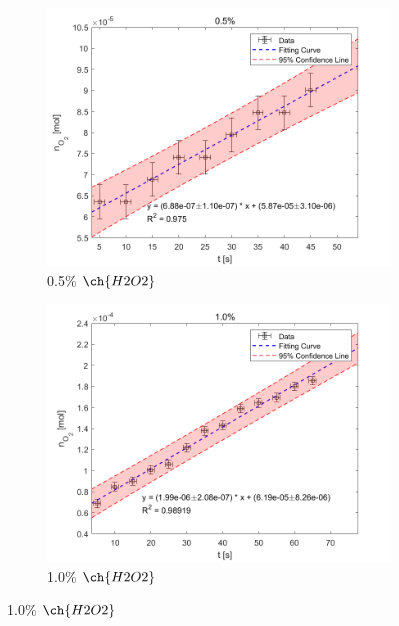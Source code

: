 \documentclass[%
 reprint,
 amsmath,amssymb,
 aps,
]{revtex4-2}
\begin{document}
\begin{figure}[htbp]
	\begin{subfigure}{0.4\textwidth}
		\includegraphics[width = 1\linewidth]{MOL_05.png}%
		\caption{\label{fig:MOL_05}0.5\% $\ch{H2O2}$}
	\end{subfigure}
	\begin{subfigure}{0.4\textwidth}
		\includegraphics[width = 1\linewidth]{MOL_10.png}%
		\caption{\label{fig:MOL_10}1.0\% $\ch{H2O2}$}
	\end{subfigure}


\end{figure}
\end{document}
